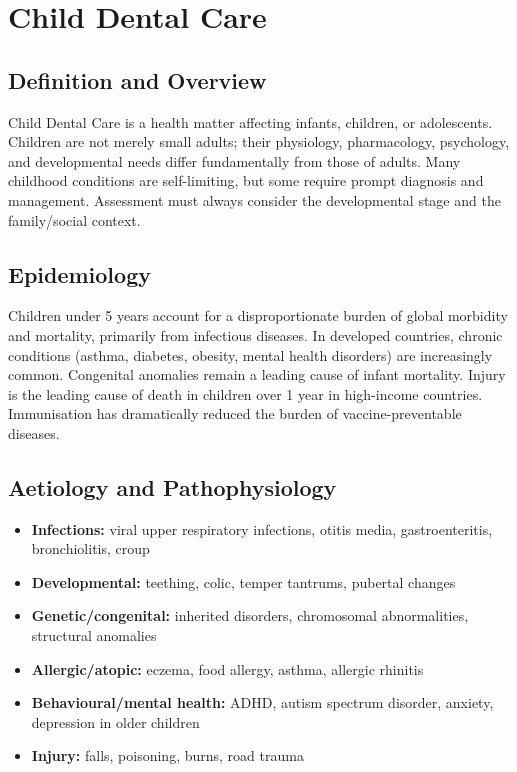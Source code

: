 \chapter{Child Dental Care}

\section*{Definition and Overview}
Child Dental Care is a health matter affecting infants, children, or adolescents. Children are not merely small adults; their physiology, pharmacology, psychology, and developmental needs differ fundamentally from those of adults. Many childhood conditions are self-limiting, but some require prompt diagnosis and management. Assessment must always consider the developmental stage and the family/social context.

\section*{Epidemiology}
Children under 5 years account for a disproportionate burden of global morbidity and mortality, primarily from infectious diseases. In developed countries, chronic conditions (asthma, diabetes, obesity, mental health disorders) are increasingly common. Congenital anomalies remain a leading cause of infant mortality. Injury is the leading cause of death in children over 1 year in high-income countries. Immunisation has dramatically reduced the burden of vaccine-preventable diseases.

\section*{Aetiology and Pathophysiology}
\begin{itemize}
    \item \textbf{Infections:} viral upper respiratory infections, otitis media, gastroenteritis, bronchiolitis, croup
    \item \textbf{Developmental:} teething, colic, temper tantrums, pubertal changes
    \item \textbf{Genetic/congenital:} inherited disorders, chromosomal abnormalities, structural anomalies
    \item \textbf{Allergic/atopic:} eczema, food allergy, asthma, allergic rhinitis
    \item \textbf{Behavioural/mental health:} ADHD, autism spectrum disorder, anxiety, depression in older children
    \item \textbf{Injury:} falls, poisoning, burns, road trauma
\end{itemize}

